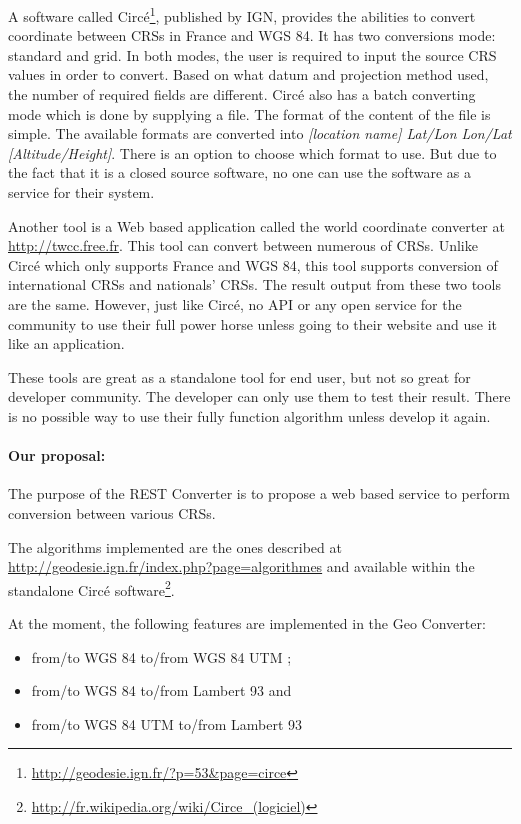 A software called Circ\'e\footnote{\url{http://geodesie.ign.fr/?p=53&page=circe}}, published by IGN, provides the abilities to convert coordinate between CRSs in France and WGS 84. It has two conversions mode: standard and grid. In both modes, the user is required to input the source CRS values in order to convert. Based on what datum and projection method used, the number of required fields are different. 
Circ\'e also has a batch converting mode which is done by supplying a file. The format of the content of the file is simple. The available formats are converted into \textsl{[location name] {Lat/Lon} {Lon/Lat} [Altitude/Height]}. There is an option to choose which format to use. But due to the fact that it is a closed source software, no one can use the software as a service for their system.

Another tool is a Web based application called the world coordinate converter at \url{http://twcc.free.fr}. This tool can convert between numerous of CRSs. Unlike Circ\'e which only supports France and WGS 84, this tool supports conversion of international CRSs and nationals' CRSs. The result output from these two tools are the same. However, just like Circ\'e, no API or any open service for the community to use their full power horse unless going to their website and use it like an application.

These tools are great as a standalone tool for end user, but not so great for developer community. The developer can only use them to test their result. There is no possible way to use their fully function algorithm unless develop it again. 
\paragraph{Our proposal:} The purpose of the REST Converter is to propose a web based service to perform conversion between various CRSs.

The algorithms implemented are the ones described at \url{http://geodesie.ign.fr/index.php?page=algorithmes} and available within the standalone Circ\'e software\footnote{\url{http://fr.wikipedia.org/wiki/Circe_(logiciel)}}.

At the moment, the following features are implemented in the Geo Converter:
\begin{itemize}
\item from/to WGS 84 to/from WGS 84 UTM ;
\item from/to WGS 84  to/from Lambert 93 and 
\item from/to WGS 84 UTM to/from Lambert 93
\end{itemize}   

